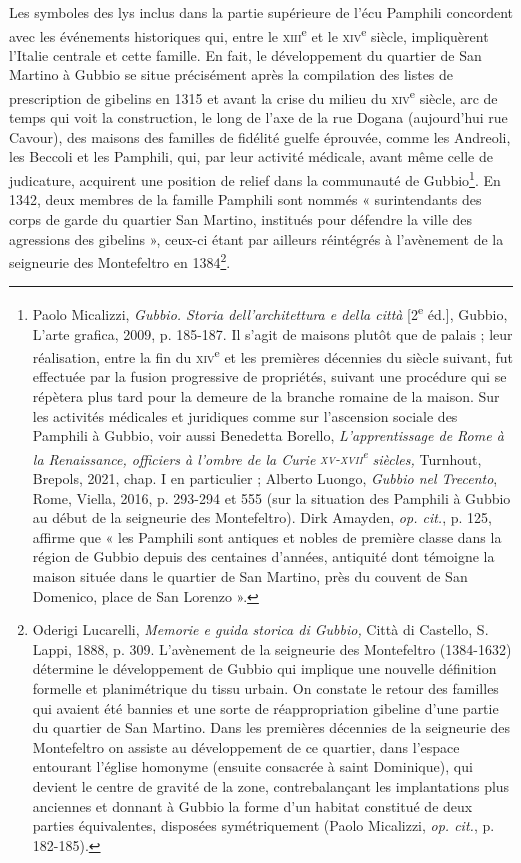 \documentclass[12pt,twoside,openany]{book}
\begin{document}
Les symboles des lys inclus dans la partie supérieure de l’écu Pamphili concordent avec les événements historiques qui, entre le \textsc{xiii}\textsuperscript{e} et le \textsc{xiv}\textsuperscript{e} siècle, impliquèrent l’Italie centrale et cette famille. En fait, le développement du quartier de San Martino à Gubbio se situe précisément après la compilation des listes de prescription de gibelins en 1315 et avant la crise du milieu du \textsc{xiv}\textsuperscript{e }siècle, arc de temps qui voit la construction, le long de l’axe de la rue Dogana (aujourd’hui rue Cavour), des maisons des familles de fidélité guelfe éprouvée, comme les Andreoli, les Beccoli et les Pamphili, qui, par leur activité médicale, avant même celle de judicature, acquirent une position de relief dans la communauté de Gubbio\footnote{Paolo Micalizzi, \textit{Gubbio. Storia dell’architettura e della città} [2\textsuperscript{e} éd.], Gubbio, L’arte grafica, 2009, p. 185-187. Il s’agit de maisons plutôt que de palais ; leur réalisation, entre la fin du \textsc{xiv}\textsuperscript{e} et les premières décennies du siècle suivant, fut effectuée par la fusion progressive de propriétés, suivant une procédure qui se répètera plus tard pour la demeure de la branche romaine de la maison. Sur les activités médicales et juridiques comme sur l’ascension sociale des Pamphili à Gubbio, voir aussi Benedetta Borello, \textit{L’apprentissage de Rome à la Renaissance, officiers à l’ombre de la Curie }\textit{\textsc{xv}}\textit{-}\textit{\textsc{xvii}}\textit{\textsuperscript{e}}\textit{ siècles,} Turnhout, Brepols, 2021, chap. I en particulier ; Alberto Luongo, \textit{Gubbio nel Trecento}, Rome, Viella, 2016, p. 293-294 et 555 (sur la situation des Pamphili à Gubbio au début de la seigneurie des Montefeltro). Dirk Amayden, \textit{op. cit.}, p. 125, affirme que « les Pamphili sont antiques et nobles de première classe dans la région de Gubbio depuis des centaines d’années, antiquité dont témoigne la maison située dans le quartier de San Martino, près du couvent de San Domenico, place de San Lorenzo ».}. En 1342, deux membres de la famille Pamphili sont nommés « surintendants des corps de garde du quartier San Martino, institués pour défendre la ville des agressions des gibelins », ceux-ci étant par ailleurs réintégrés à l’avènement de la seigneurie des Montefeltro en 1384\footnote{Oderigi Lucarelli, \textit{Memorie e guida storica di Gubbio, }Città di Castello, S. Lappi, 1888, p. 309. L’avènement de la seigneurie des Montefeltro (1384-1632) détermine le développement de Gubbio qui implique une nouvelle définition formelle et planimétrique du tissu urbain. On constate le retour des familles qui avaient été bannies et une sorte de réappropriation gibeline d’une partie du quartier de San Martino. Dans les premières décennies de la seigneurie des Montefeltro on assiste au développement de ce quartier, dans l’espace entourant l’église homonyme (ensuite consacrée à saint Dominique), qui devient le centre de gravité de la zone, contrebalançant les implantations plus anciennes et donnant à Gubbio la forme d’un habitat constitué de deux parties équivalentes, disposées symétriquement (Paolo Micalizzi, \textit{op. cit.}, p. 182-185).}.
\end{document}
